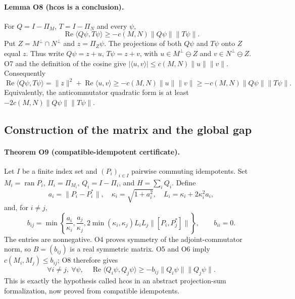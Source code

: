 \paragraph{Lemma O8 (hcos is a conclusion).}
For $Q=I-\Pi_M$, $T=I-\Pi_N$ and every $\psi$,
\begin{equation}
 \operatorname{Re}\langle Q\psi,T\psi\rangle
 \geq-c(M,N)\|Q\psi\|\|T\psi\|.
 \label{urgent:hcos}
\end{equation}
Put $Z=M^\perp\cap N^\perp$ and $z=\Pi_Z\psi$.
The projections of both $Q\psi$ and $T\psi$ onto $Z$ equal $z$.
Thus write $Q\psi=z+u$, $T\psi=z+v$, with
$u\in M^\perp\ominus Z$ and $v\in N^\perp\ominus Z$.
O7 and the definition of the cosine give
$|\langle u,v\rangle|\leq c(M,N)\|u\|\|v\|$.
Consequently
\[
 \operatorname{Re}\langle Q\psi,T\psi\rangle
 =\|z\|^2+\operatorname{Re}\langle u,v\rangle
 \geq-c(M,N)\|u\|\|v\|
 \geq-c(M,N)\|Q\psi\|\|T\psi\|.
\]
Equivalently, the anticommutator quadratic form is at least
$-2c(M,N)\|Q\psi\|\|T\psi\|$.

\subsection{Construction of the matrix and the global gap}

\paragraph{Theorem O9 (compatible-idempotent certificate).}
Let $I$ be a finite index set and $(P_i)_{i\in I}$ pairwise commuting
idempotents. Set $M_i=\operatorname{ran}P_i$, $\Pi_i=\Pi_{M_i}$,
$Q_i=I-\Pi_i$, and $H=\sum_iQ_i$. Define
\[
 a_i=\|P_i-P_i^*\|,\quad
 \kappa_i=\sqrt{1+a_i^2},\quad
 L_i=\kappa_i+2\kappa_i^2a_i,
\]
and, for $i\ne j$,
\[
 b_{ij}=\min\left\{
 \frac{a_i}{\kappa_i},\frac{a_j}{\kappa_j},
 2\min(\kappa_i,\kappa_j)L_iL_j\|[P_i,P_j^*]\|
 \right\},\qquad b_{ii}=0.
\]
The entries are nonnegative. O4 proves symmetry of the adjoint-commutator
norm, so $B=(b_{ij})$ is a real symmetric matrix.
O5 and O6 imply $c(M_i,M_j)\leq b_{ij}$; O8 therefore gives
\[
 \boxed{\ \forall i\ne j,\ \forall\psi,\quad
 \operatorname{Re}\langle Q_i\psi,Q_j\psi\rangle
 \geq-b_{ij}\|Q_i\psi\|\|Q_j\psi\|.\ }
\]
This is exactly the hypothesis called hcos in an abstract projection-sum
formalization, now proved from compatible idempotents.

